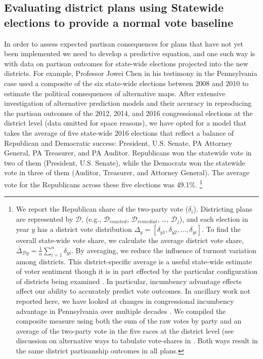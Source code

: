     \subsection*{Evaluating district plans using Statewide elections to provide a normal vote baseline}
%
    In order to assess expected partisan consequences for plans that have not yet been implemented we need to develop a predictive equation, and one such way is with data on partisan outcomes for state-wide elections projected into the new districts. For example, Professor Jowei Chen in his testimony in the Pennsylvania case used a composite of the six state-wide elections between 2008 and 2010 to estimate the political consequences of alternative maps. After extensive investigation of alternative prediction models and their accuracy in reproducing the partisan outcomes of the 2012, 2014, and 2016 congressional elections at the district level (data omitted for space reasons), we have opted for a model that takes the average of five state-wide 2016 elections that reflect a balance of Republican and Democratic success: President, U.S. Senate, PA Attorney General, PA Treasurer, and PA Auditor. Republicans won the statewide vote in two of them (President, U.S. Senate), while the Democrats won the statewide vote in three of them (Auditor, Treasurer, and Attorney General). The average vote for the Republicans across these five elections was 49.1\%.
    \footnote{We report the Republican share of the two-party vote ($\delta_{i}$). Districting plans are represented by $\mathcal D $, (e.g., $\mathcal D_{enacted}$, $\mathcal D_{remedial}$, \dots, $\mathcal D_{j}$), and each election in year $ y $ has a district vote distribution $ \Delta_{y} = [\delta_{y1}, \delta_{y2}, \dots, \delta_{yi}] $. To find the overall state-wide vote share, we calculate the average district vote share, $ \bar{\Delta}_{\mathcal D y} = \frac{1}{n}\sum\limits_{i=1}^{n} \delta_{yi} $. By averaging, we reduce the influence of turnout variation among districts. This district-specific average is a useful state-wide estimate of voter sentiment though it is in part effected by the particular configuration of districts being examined \citep[see e.g.][cf. \cite{Grofman_et_al_1997__IntedgratedPerspective_ES}]{Kastellec_et_al_2008_PS}. In particular, incumbency advantage effects affect our ability to accurately predict vote outcomes. In ancillary work not reported here, we have looked at changes in congressional incumbency advantage in Pennsylvania over multiple decades \citep[cf.][]{Jacobson2015}. We compiled the composite measure using both the sum of the raw votes by party and an average of the two-party vote in the five races at the district level (see discussion on alternative ways to tabulate vote-shares in \citet{Grofman_et_al_1997__IntedgratedPerspective_ES}. Both ways result in the same district partisanship outcomes in all plans.}
